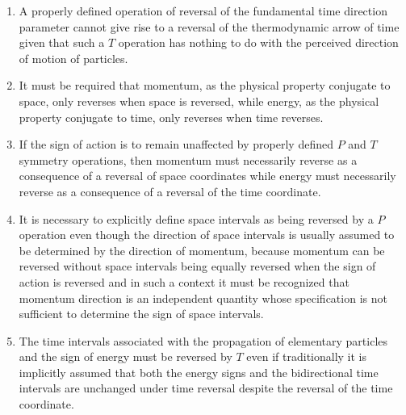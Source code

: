 \documentclass[notitlepage,12pt]{report}
\begin{document}
\begin{enumerate}
\item A properly defined operation of reversal of the fundamental time direction parameter cannot give rise to a reversal of the thermodynamic arrow of time given that such a $T$ operation has nothing to do with the perceived direction of motion of particles.

\item It must be required that momentum, as the physical property conjugate to space, only reverses when space is reversed, while energy, as the physical property conjugate to time, only reverses when time reverses.

\item If the sign of action is to remain unaffected by properly defined $P$ and $T$ symmetry operations, then momentum must necessarily reverse as a consequence of a reversal of space coordinates while energy must necessarily reverse as a consequence of a reversal of the time coordinate.

\item It is necessary to explicitly define space intervals as being reversed by a $P$ operation even though the direction of space intervals is usually assumed to be determined by the direction of momentum, because momentum can be reversed without space intervals being equally reversed when the sign of action is reversed and in such a context it must be recognized that momentum direction is an independent quantity whose specification is not sufficient to determine the sign of space intervals.

\item The time intervals associated with the propagation of elementary particles and the sign of energy must be reversed by $T$ even if traditionally it is implicitly assumed that both the energy signs and the bidirectional time intervals are unchanged under time reversal despite the reversal of the time coordinate.


\end{enumerate}
\end{document}
